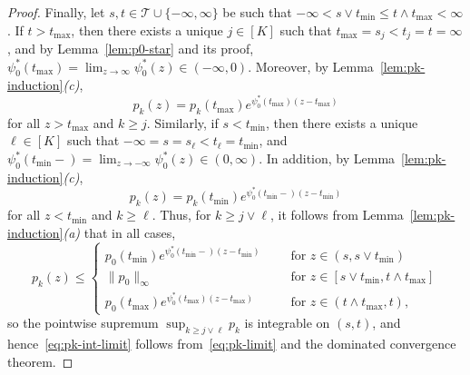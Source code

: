 \documentclass[10pt,a4paper]{amsart}
\newcommand{\norm}[1]{\|{#1}\|}
\begin{document}
\begin{proof}
Finally, let $s,t \in \mathcal{T} \cup \{-\infty,\infty\}$ be such that $-\infty < s \vee t_{\min} \leq t \wedge t_{\max} < \infty$. If $t > t_{\max}$, then there exists a unique $j \in [K]$ such that $t_{\max} = s_j < t_j = t = \infty$, and by Lemma~\ref{lem:p0-star} and its proof, $\psi_0^*(t_{\max}) = \lim_{z \to \infty}\psi_0^*(z) \in (-\infty,0)$. Moreover, by Lemma~\ref{lem:pk-induction}\textit{(c)},
\[
p_k(z) = p_k(t_{\max})e^{\psi_0^*(t_{\max})(z - t_{\max})}
\]
for all $z > t_{\max}$ and $k \geq j$. Similarly, if $s < t_{\min}$, then there exists a unique $\ell \in [K]$ such that $-\infty = s = s_\ell < t_\ell = t_{\min}$, and $\psi_0^*(t_{\min}-) = \lim_{z \to -\infty}\psi_0^*(z) \in (0,\infty)$. In addition, by Lemma~\ref{lem:pk-induction}\textit{(c)},
\[
p_k(z) = p_k(t_{\min})e^{\psi_0^*(t_{\min}-)(z - t_{\min})}
\]
for all $z < t_{\min}$ and $k \geq \ell$. Thus, for $k \geq j \vee \ell$, it follows from Lemma~\ref{lem:pk-induction}\textit{(a)} that in all cases,
\[
p_k(z) \leq
\begin{cases}
p_0(t_{\min})e^{\psi_0^*(t_{\min}-)(z - t_{\min})} \;\;&\quad\text{for }z \in (s,s \vee t_{\min}) \\
\norm{p_0}_\infty \;\;&\quad\text{for }z \in [s \vee t_{\min},t \wedge t_{\max}] \\
p_0(t_{\max})e^{\psi_0^*(t_{\max})(z - t_{\max})} \;\;&\quad\text{for }z \in (t \wedge t_{\max},t),
\end{cases}
\]
so the pointwise supremum $\sup_{k \geq j \vee \ell} p_k$ is integrable on $(s,t)$, and hence~\eqref{eq:pk-int-limit} follows from~\eqref{eq:pk-limit} and the dominated convergence theorem.
\end{proof}
\end{document}
